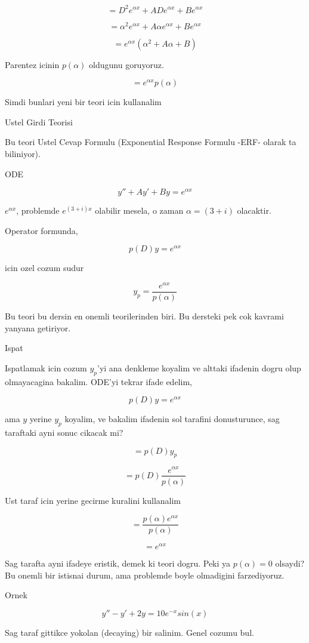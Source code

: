 \documentclass[12pt,fleqn]{article}\usepackage{../common}
\begin{document}
\[ = D^2e^{\alpha x} + ADe^{\alpha x} + Be^{\alpha x} \]

\[ = \alpha^2 e^{\alpha x} + A \alpha e^{\alpha x} + Be^{\alpha x} \]

\[ = e^{\alpha x}(\alpha^2  + A \alpha + B)\]

Parentez icinin $p(\alpha)$ oldugunu goruyoruz. 

\[ = e^{\alpha x}p(\alpha)\]

Simdi bunlari yeni bir teori icin kullanalim

Ustel Girdi Teorisi 

Bu teori Ustel Cevap Formulu (Exponential Response Formulu -ERF- olarak ta
biliniyor).

ODE

\[ y'' + Ay' + By = e^{\alpha x} \]

$e^{\alpha x}$, problemde $e^{(3+i)x}$ olabilir mesela, o zaman $\alpha
= (3+i)$ olacaktir. 

Operator formunda,

\[ p(D)y = e^{\alpha x} \]

icin ozel cozum sudur

\[ y_p = \frac{e^{\alpha x}}{p(\alpha)} \]

Bu teori bu dersin en onemli teorilerinden biri. Bu dersteki pek cok
kavrami yanyana getiriyor. 

Ispat

Ispatlamak icin cozum $y_p$'yi ana denkleme koyalim ve alttaki ifadenin dogru
olup olmayacagina bakalim. ODE'yi tekrar ifade edelim, 

\[ p(D)y =  e^{\alpha x} \]

ama $y$ yerine $y_p$ koyalim, ve bakalim ifadenin sol tarafini
donusturunce, sag taraftaki ayni sonuc cikacak mi?

\[ = p(D)y_p\]

\[ = p(D)\frac{e^{\alpha x}}{p(\alpha)}  \]

Ust taraf icin yerine gecirme kuralini kullanalim

\[ = \frac{p(\alpha)e^{\alpha x}}{p(\alpha)} \]

\[ = e^{\alpha x} \]

Sag tarafta ayni ifadeye eristik, demek ki teori dogru. Peki ya $p(\alpha)
= 0$ olsaydi? 
Bu onemli bir istisnai durum, ama problemde boyle olmadigini farzediyoruz.

Ornek 

\[ y'' - y' + 2y = 10e^{-x}sin(x) \]

Sag taraf gittikce yokolan (decaying) bir salinim. Genel cozumu bul.
\end{document}
